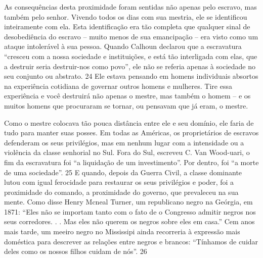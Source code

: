 \par
 
As consequências desta proximidade foram sentidas não apenas pelo escravo, mas também pelo senhor. Vivendo todos os dias com sua mestria, ele se identificou inteiramente com ela. Esta identificação era tão completa que qualquer sinal de desobediência do escravo – muito menos de sua emancipação – era visto como um ataque intolerável à sua pessoa. Quando Calhoun declarou que a escravatura “cresceu com a nossa sociedade e instituições, e está tão interligada com elas, que a destruir seria destruir-nos como povo”, ele não se referia apenas à sociedade no seu conjunto ou abstrato.
 {\color{blue} 24}  
Ele estava pensando em homens individuais absortos na experiência cotidiana de governar outros homens e mulheres. Tire essa experiência e você destruirá não apenas o mestre, mas também o homem – e os muitos homens que procuraram se tornar, ou pensavam que já eram, o mestre.
 
\par
 
Como o mestre colocava tão pouca distância entre ele e seu domínio, ele faria de tudo para manter suas posses. Em todas as Américas, os proprietários de escravos defenderam os seus privilégios, mas em nenhum lugar com a intensidade ou a violência da classe senhorial no Sul. Fora do Sul, escreveu C. Van Wood-uari, o fim da escravatura foi “a liquidação de um investimento”. Por dentro, foi “a morte de uma sociedade”.
 {\color{blue} 25}  
E quando, depois da Guerra Civil, a classe dominante lutou com igual ferocidade para restaurar os seus privilégios e poder, foi a proximidade do comando, a proximidade do governo, que prevaleceu na sua mente. Como disse Henry Mcneal Turner, um republicano negro na Geórgia, em 1871: “Eles não se importam tanto com o fato de o Congresso admitir negros nos seus corredores. . . Mas eles não querem os negros sobre eles em casa.” Cem anos mais tarde, um meeiro negro no Mississipi ainda recorreria à expressão mais doméstica para descrever as relações entre negros e brancos: “Tínhamos de cuidar deles como os nossos filhos cuidam de nós”.
 {\color{blue} 26}  

 
\par
 
